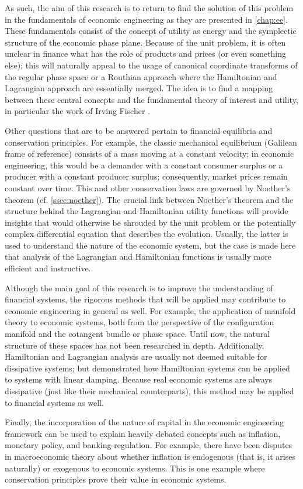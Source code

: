 As such, the aim of this research is to return to find the solution of this problem in the fundamentals of economic engineering as they are presented in \cref{chap:ee}. These fundamentals consist of the concept of utility as energy and the symplectic structure of the economic phase plane. Because of the unit problem, it is often unclear in finance what has the role of products and prices (or even something else); this will naturally appeal to the usage of canonical coordinate transforms of the regular phase space or a Routhian approach where the Hamiltonian and Lagrangian approach are essentially merged. The idea is to find a mapping between these central concepts and the fundamental theory of interest and utility, in particular the work of Irving Fischer \cite{Fisher1906,Fisher1930}.

Other questions that are to be answered pertain to financial equilibria and conservation principles. For example, the classic mechanical equilibrium (Galilean frame of reference) consists of a mass moving at a constant velocity; in economic engineering, this would be a demander with a constant consumer surplus or a producer with a constant producer surplus; consequently, market prices remain constant over time. This and other conservation laws are governed by Noether's theorem (cf. \cref{ssec:noether}). The crucial link between Noether's theorem and the structure behind the Lagrangian and Hamiltonian utility functions will provide insights that would otherwise be shrouded by the unit problem or the potentially complex differential equation that describes the evolution. Usually, the latter is used to understand the nature of the economic system, but the case is made here that analysis of the Lagrangian and Hamiltonian functions is usually more efficient and instructive.

Although the main goal of this research is to improve the understanding of financial systems, the rigorous methods that will be applied may contribute to economic engineering in general as well. For example, the application of manifold theory to economic systems, both from the perspective of the configuration manifold and the cotangent bundle or phase space. Until now, the natural structure of these spaces has not been researched in depth. Additionally, Hamiltonian and Lagrangian analysis are usually not deemed suitable for dissipative systems; but \citet{Hutters2020} demonstrated how Hamiltonian systems can be applied to systems with linear damping. Because real economic systems are always dissipative (just like their mechanical counterparts), this method may be applied to financial systems as well.

Finally, the incorporation of the nature of capital in the economic engineering framework can be used to explain heavily debated concepts such as inflation, monetary policy, and banking regulation. For example, there have been disputes in  macroeconomic theory about whether inflation is endogenous (that is, it arises naturally) or exogenous to economic systems. This is one example where conservation principles prove their value in economic systems.